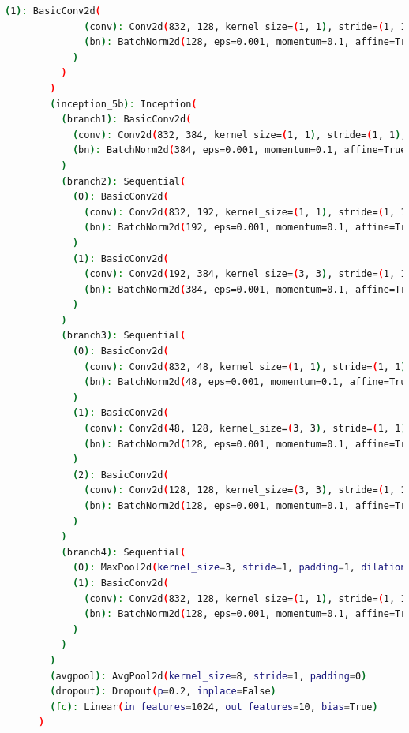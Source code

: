 \documentclass[a4paper, 12pt]{article}
\begin{document}
\begin{lstlisting}[language=sh]
            (1): BasicConv2d(
              (conv): Conv2d(832, 128, kernel_size=(1, 1), stride=(1, 1), bias=False)
              (bn): BatchNorm2d(128, eps=0.001, momentum=0.1, affine=True, track_running_stats=True)
            )
          )
        )
        (inception_5b): Inception(
          (branch1): BasicConv2d(
            (conv): Conv2d(832, 384, kernel_size=(1, 1), stride=(1, 1), bias=False)
            (bn): BatchNorm2d(384, eps=0.001, momentum=0.1, affine=True, track_running_stats=True)
          )
          (branch2): Sequential(
            (0): BasicConv2d(
              (conv): Conv2d(832, 192, kernel_size=(1, 1), stride=(1, 1), bias=False)
              (bn): BatchNorm2d(192, eps=0.001, momentum=0.1, affine=True, track_running_stats=True)
            )
            (1): BasicConv2d(
              (conv): Conv2d(192, 384, kernel_size=(3, 3), stride=(1, 1), padding=(1, 1), bias=False)
              (bn): BatchNorm2d(384, eps=0.001, momentum=0.1, affine=True, track_running_stats=True)
            )
          )
          (branch3): Sequential(
            (0): BasicConv2d(
              (conv): Conv2d(832, 48, kernel_size=(1, 1), stride=(1, 1), bias=False)
              (bn): BatchNorm2d(48, eps=0.001, momentum=0.1, affine=True, track_running_stats=True)
            )
            (1): BasicConv2d(
              (conv): Conv2d(48, 128, kernel_size=(3, 3), stride=(1, 1), padding=(1, 1), bias=False)
              (bn): BatchNorm2d(128, eps=0.001, momentum=0.1, affine=True, track_running_stats=True)
            )
            (2): BasicConv2d(
              (conv): Conv2d(128, 128, kernel_size=(3, 3), stride=(1, 1), padding=(1, 1), bias=False)
              (bn): BatchNorm2d(128, eps=0.001, momentum=0.1, affine=True, track_running_stats=True)
            )
          )
          (branch4): Sequential(
            (0): MaxPool2d(kernel_size=3, stride=1, padding=1, dilation=1, ceil_mode=False)
            (1): BasicConv2d(
              (conv): Conv2d(832, 128, kernel_size=(1, 1), stride=(1, 1), bias=False)
              (bn): BatchNorm2d(128, eps=0.001, momentum=0.1, affine=True, track_running_stats=True)
            )
          )
        )
        (avgpool): AvgPool2d(kernel_size=8, stride=1, padding=0)
        (dropout): Dropout(p=0.2, inplace=False)
        (fc): Linear(in_features=1024, out_features=10, bias=True)
      )
\end{lstlisting}
\end{document}
